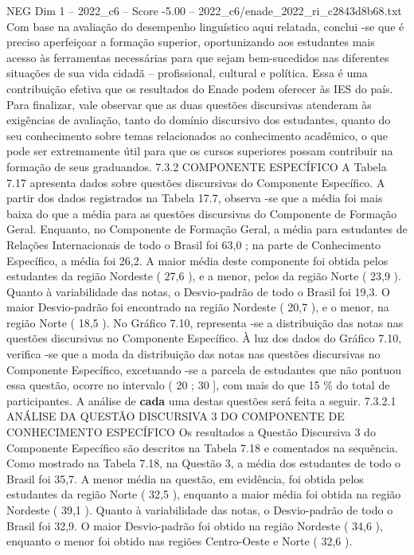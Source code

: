 \begin{textsample}{NEG Dim 1 – 2022\_c6 – Score -5.00 – 2022\_c6/enade\_2022\_ri\_c2843d8b68.txt}
Com base na avaliação do desempenho linguístico aqui relatada, conclui -se que é preciso aperfeiçoar a formação superior, oportunizando aos estudantes mais acesso às ferramentas necessárias para que sejam bem-sucedidos nas diferentes situações de sua vida cidadã – profissional, cultural e política.
Essa é uma contribuição efetiva que os resultados do Enade podem oferecer às IES do país.
Para finalizar, vale observar que as duas questões discursivas atenderam às exigências de avaliação, tanto do domínio discursivo dos estudantes, quanto do seu conhecimento sobre temas relacionados ao conhecimento acadêmico, o que pode ser extremamente útil para que os cursos superiores possam contribuir na formação de seus graduandos. 7.3.2 COMPONENTE ESPECÍFICO A Tabela 7.17 apresenta dados sobre questões discursivas do Componente Específico.
A partir dos dados registrados na Tabela 17.7, observa -se que a média foi mais baixa do que a média para as questões discursivas do Componente de Formação Geral.
Enquanto, no Componente de Formação Geral, a média para estudantes de Relações Internacionais de todo o Brasil foi 63,0 ; na parte de Conhecimento Específico, a média foi 26,2.
A maior média deste componente foi obtida pelos estudantes da região Nordeste ( 27,6 ), e a menor, pelos da região Norte ( 23,9 ).
Quanto à variabilidade das notas, o Desvio-padrão de todo o Brasil foi 19,3.
O maior Desvio-padrão foi encontrado na região Nordeste ( 20,7 ), e o menor, na região Norte ( 18,5 ).
No Gráfico 7.10, representa -se a distribuição das notas nas questões discursivas no Componente Específico.
À luz dos dados do Gráfico 7.10, verifica -se que a moda da distribuição das notas nas questões discursivas no Componente Específico, excetuando -se a parcela de estudantes que não pontuou essa questão, ocorre no intervalo ( 20 ; 30 ], com mais do que 15 \% do total de participantes.
A análise de \textbf{cada} uma destas questões será feita a seguir. 7.3.2.1 ANÁLISE DA QUESTÃO DISCURSIVA 3 DO COMPONENTE DE CONHECIMENTO ESPECÍFICO Os resultados a Questão Discursiva 3 do Componente Específico são descritos na Tabela 7.18 e comentados na sequência.
Como mostrado na Tabela 7.18, na Questão 3, a média dos estudantes de todo o Brasil foi 35,7.
A menor média na questão, em evidência, foi obtida pelos estudantes da região Norte ( 32,5 ), enquanto a maior média foi obtida na região Nordeste ( 39,1 ).
Quanto à variabilidade das notas, o Desvio-padrão de todo o Brasil foi 32,9.
O maior Desvio-padrão foi obtido na região Nordeste ( 34,6 ), enquanto o menor foi obtido nas regiões Centro-Oeste e Norte ( 32,6 ).

\end{textsample}
